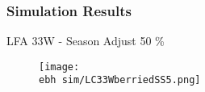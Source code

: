 \documentclass{beamer}
\newcommand{\ebh}{\string~/bio.data/bio.lobster/figures/LFA2733Framework2018/} %
\begin{document}
\begin{frame}
\frametitle{Simulation Results}
LFA 33W - Season Adjust 50 \%
\begin{figure}
        \begin{center}
            \texttt{[image: \\ebh sim/LC33WberriedSS5.png]}
        \end{center}
    \end{figure}
\end{frame}
\end{document}
